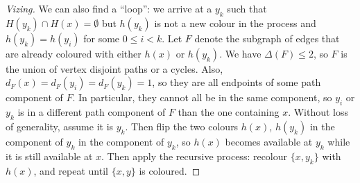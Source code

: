 \documentclass[12pt, a4paper]{book}
\theoremstyle{nonumberplain}
\newtheorem{proof}{Proof}
\begin{document}
\begin{proof}[Vizing]
    We can also find a ``loop'': we arrive at a $y_k$ such that $H(y_k)\cap H(x)=\emptyset$ but $h(y_k)$ is not a new colour in the process and $h(y_k)=h(y_i)$ for some $0\leq i<k$.
    Let $F$ denote the subgraph of edges that are already coloured with either $h(x)$ or $h(y_k)$.
    We have $\Delta(F)\leq 2$, so $F$ is the union of vertex disjoint paths or a cycles.
    Also, $d_F(x)=d_F(y_i)=d_F(y_k)=1$, so they are all endpoints of some path component of $F$.
    In particular, they cannot all be in the same component, so $y_i$ or $y_k$ is in a different path component of $F$ than the one containing $x$.
    Without loss of generality, assume it is $y_k$.
    Then flip the two colours $h(x)$, $h(y_k)$ in the component of $y_k$ in the component of $y_k$, so $h(x)$ becomes available at $y_k$ while it is still available at $x$.
    Then apply the recursive process: recolour $\{x,y_k\}$ with $h(x)$, and repeat until $\{x,y\}$ is coloured.
\end{proof}
\end{document}
